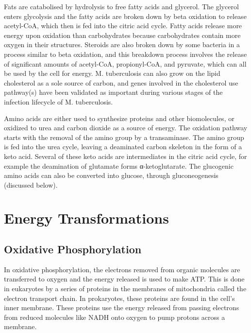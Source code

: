 Fats are catabolised by hydrolysis to free fatty acids and glycerol. The glycerol enters glycolysis and the fatty acids are broken down by beta oxidation to release acetyl-CoA, which then is fed into the citric acid cycle. Fatty acids release more energy upon oxidation than carbohydrates because carbohydrates contain more oxygen in their structures. Steroids are also broken down by some bacteria in a process similar to beta oxidation, and this breakdown process involves the release of significant amounts of acetyl-CoA, propionyl-CoA, and pyruvate, which can all be used by the cell for energy. M. tuberculosis can also grow on the lipid cholesterol as a sole source of carbon, and genes involved in the cholesterol use pathway(s) have been validated as important during various stages of the infection lifecycle of M. tuberculosis.

Amino acids are either used to synthesize proteins and other biomolecules, or oxidized to urea and carbon dioxide as a source of energy. The oxidation pathway starts with the removal of the amino group by a transaminase. The amino group is fed into the urea cycle, leaving a deaminated carbon skeleton in the form of a keto acid. Several of these keto acids are intermediates in the citric acid cycle, for example the deamination of glutamate forms α-ketoglutarate. The glucogenic amino acids can also be converted into glucose, through gluconeogenesis (discussed below).

\hypertarget{energy-transformations}{%
\section{Energy Transformations}\label{energy-transformations}}

\hypertarget{oxidative-phosphorylation}{%
\subsection{Oxidative Phosphorylation}\label{oxidative-phosphorylation}}

In oxidative phosphorylation, the electrons removed from organic molecules are transferred to oxygen and the energy released is used to make ATP. This is done in eukaryotes by a series of proteins in the membranes of mitochondria called the electron transport chain. In prokaryotes, these proteins are found in the cell's inner membrane. These proteins use the energy released from passing electrons from reduced molecules like NADH onto oxygen to pump protons across a membrane.

